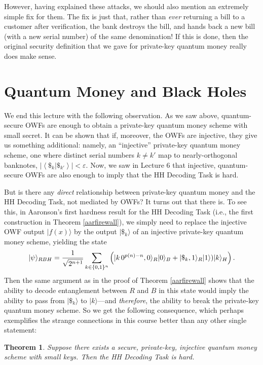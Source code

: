 \documentclass[11pt]{report}
\theoremstyle{plain}
\newtheorem{theorem}{Theorem}[section]
\theoremstyle{definition}
\newcommand{\eps}{\varepsilon}
\renewcommand{\ket}[1]{|#1\rangle}
\begin{document}
However, having explained these attacks, we should also mention an extremely simple fix for them.  The fix is just that, rather than {\em ever} returning a bill to a customer after verification, the bank destroys the bill, and hands back a new bill (with a new serial number) of the same denomination!  If this is done, then the original security definition that we gave for private-key quantum money really does make sense.

\section{Quantum Money and Black Holes}

We end this lecture with the following observation.  As we saw above, quantum-secure OWFs are enough to obtain a private-key quantum money scheme with small secret.  It can be shown that if, moreover, the OWFs are injective, they give us something additional: namely, an ``injective'' private-key quantum money scheme, one where distinct serial numbers $k\ne k'$ map to nearly-orthogonal banknotes, $\left| \left\langle \$_k | \$_{k'} \right\rangle \right| < \eps$.  Now, we saw in Lecture 6 that injective, quantum-secure OWFs are also enough to imply that the HH Decoding Task is hard.

But is there any {\em direct} relationship between private-key quantum money and the HH Decoding Task, not mediated by OWFs?  It turns out that there is.  To see this, in Aaronson's first hardness result for the HH Decoding Task (i.e., the first construction in Theorem \ref{aarfirewall}), we simply need to replace the injective OWF output $\ket{f(x)}$ by the output $\ket{\$_k}$ of an injective private-key quantum money scheme, yielding the state
$$
\ket{\psi}_{RBH} = {1 \over \sqrt{2^{n+1}}} \sum_{k\in\{0,1\}^n}  \left( \ket{k \, 0^{p(n)-n},0}_R \ket{0}_B + \ket{\$_k,1}_R \ket{1} ) \ket{k}_H \right).
$$
Then the same argument as in the proof of Theorem \ref{aarfirewall} shows that the ability to decode entanglement between $R$ and $B$ in this state would imply the ability to pass from $\ket{\$_k}$ to $\ket{k}$---and {\em therefore}, the ability to break the private-key quantum money scheme.  So we get the following consequence, which perhaps exemplifies the strange connections in this course better than any other single statement:

\begin{theorem}
\label{whoa}
Suppose there exists a secure, private-key, injective quantum money scheme with small keys.  Then the HH Decoding Task is hard.
\end{theorem}
\end{document}
